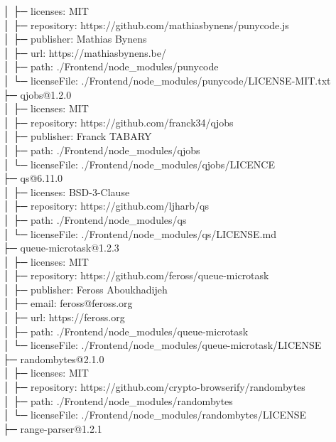 \documentclass[
    paper=a4,
    twoside=false,
    parskip=half,
    listof=entryprefix,
    listof=totoc,
    index=totoc,
    bibliography=totoc,
    headsepline,
]{scrbook}
\begin{document}
    │  ├─ licenses: MIT\\
    │  ├─ repository: https://github.com/mathiasbynens/punycode.js\\
    │  ├─ publisher: Mathias Bynens\\
    │  ├─ url: https://mathiasbynens.be/\\
    │  ├─ path: ./Frontend/node\_modules/punycode\\
    │  └─ licenseFile: ./Frontend/node\_modules/punycode/LICENSE-MIT.txt\\
    ├─ qjobs@1.2.0\\
    │  ├─ licenses: MIT\\
    │  ├─ repository: https://github.com/franck34/qjobs\\
    │  ├─ publisher: Franck TABARY\\
    │  ├─ path: ./Frontend/node\_modules/qjobs\\
    │  └─ licenseFile: ./Frontend/node\_modules/qjobs/LICENCE\\
    ├─ qs@6.11.0\\
    │  ├─ licenses: BSD-3-Clause\\
    │  ├─ repository: https://github.com/ljharb/qs\\
    │  ├─ path: ./Frontend/node\_modules/qs\\
    │  └─ licenseFile: ./Frontend/node\_modules/qs/LICENSE.md\\
    ├─ queue-microtask@1.2.3\\
    │  ├─ licenses: MIT\\
    │  ├─ repository: https://github.com/feross/queue-microtask\\
    │  ├─ publisher: Feross Aboukhadijeh\\
    │  ├─ email: feross@feross.org\\
    │  ├─ url: https://feross.org\\
    │  ├─ path: ./Frontend/node\_modules/queue-microtask\\
    │  └─ licenseFile: ./Frontend/node\_modules/queue-microtask/LICENSE\\
    ├─ randombytes@2.1.0\\
    │  ├─ licenses: MIT\\
    │  ├─ repository: https://github.com/crypto-browserify/randombytes\\
    │  ├─ path: ./Frontend/node\_modules/randombytes\\
    │  └─ licenseFile: ./Frontend/node\_modules/randombytes/LICENSE\\
    ├─ range-parser@1.2.1\\
\end{document}
